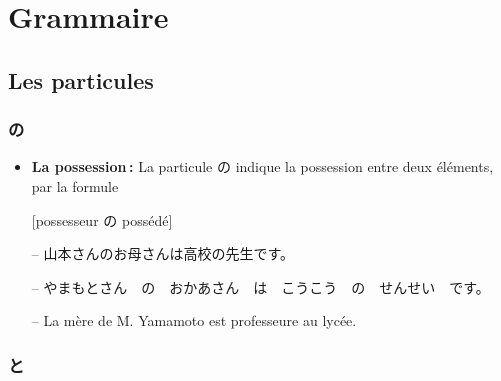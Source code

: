 \section{Grammaire}

    \subsection{Les particules}

        \subsubsection{の}

    \begin{itemize}
        \item \textbf{La possession :} La particule の indique la possession entre deux éléments, par la formule 
        \begin{center}
            [possesseur の possédé]
        \end{center}
        \begin{tcolorbox}
            -- 山本さんのお母さんは高校の先生です。

            -- やまもとさん　の　おかあさん　は　こうこう　の　せんせい　です。

            -- La mère de M. Yamamoto est professeure au lycée.
        \end{tcolorbox}
    \end{itemize}

        \subsubsection{と}


